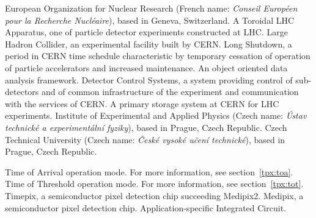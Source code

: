 
		{European Organization for Nuclear Research (French name: \textit{Conseil Européen pour la Recherche Nucléaire}), based in Geneva, Switzerland.}
		{A Toroidal LHC Apparatus, one of particle detector experiments constructed at LHC.}
		{Large Hadron Collider, an experimental facility built by CERN.}
		{Long Shutdown, a period in CERN time schedule characteristic by temporary cessation of operation of particle accelerators and increased maintenance.}
		{An object oriented data analysis framework. \cite{ROOT}}
		{Detector Control Systems, a system providing control of sub-detectors and of common infrastructure of the experiment and communication with the services of CERN.}
		{A primary storage system at CERN for LHC experiments.}
		{Institute of Experimental and Applied Physics (Czech name: \textit{Ústav technické a experimentální fyziky}), based in Prague, Czech Republic.}
		{Czech Technical University (Czech name: \textit{České vysoké učení technické}), based in Prague, Czech Republic.}

		{Time of Arrival operation mode. For more information, see section~\ref{tpx:toa}.}
		{Time of Threshold operation mode. For more information, see section~\ref{tpx:tot}.}
		{Timepix, a semiconductor pixel detection chip succeeding Medipix2.}
		{Medipix, a semiconductor pixel detection chip.}
		{Application-specific Integrated Circuit.}


